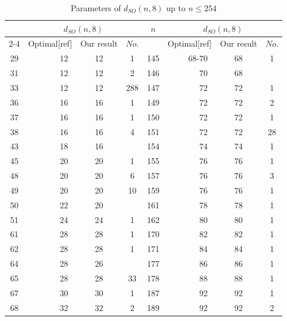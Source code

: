 \documentclass{article}
\theoremstyle{definition}
\theoremstyle{remark}
\begin{document}
\begin{table}[!htb]
\centering
\caption{Parameters of $d_{SO}(n, 8)$ up to $n\le 254$}
\label{tab:my_table_8col}
\small
\begin{tabular}{c|r|c|c|c|r|c|c}
\Xhline{2\arrayrulewidth}
\multirow{2}{*}{$n$} & \multicolumn{3}{c|}{$d_{SO}(n, 8)$} & \multirow{2}{*}{$n$} & \multicolumn{3}{c}{$d_{SO}(n, 8)$} \\
\cline{2-4} \cline{6-8}
 & Optimal[ref] & Our result & $No.$ &  & Optimal[ref] & Our result & $No.$  \\
\Xhline{2\arrayrulewidth}
29 & 12~\cite{Bouyukliev2006} & 12 & 1 & 145 & 68-70~\cite{Li2025} & 68 & 1\\
\hline
31 & 12~\cite{Bouyukliev2006} & 12 & 2 & 146 & 70~\cite{Li2025} & 68 &\\
\hline
33 & 12~\cite{Bouyukliev2006} & 12 & 288 & 147 & 72~\cite{Li2025} & 72 & 1\\
\hline
36 & 16~\cite{Bouyukliev2006} & 16 & 1 & 149 & 72~\cite{Li2025} & 72 & 2\\
\hline
37 & 16~\cite{Bouyukliev2006} & 16 & 1 & 150 & 72~\cite{Li2025} & 72 & 1\\
\hline
38 & 16~\cite{Bouyukliev2006} & 16 & 4 & 151 & 72~\cite{Li2025} & 72 & 28\\
\hline
43 & 18~\cite{Li2025} & 16 & & 154 & 74~\cite{Li2025} & 74 & 1\\
\hline
45 & 20~\cite{Li2025} & 20 & 1 & 155 & 76~\cite{Li2025} & 76 & 1\\
\hline
48 & 20~\cite{Li2025} & 20 & 6 & 157 & 76~\cite{Li2025} & 76 & 3\\
\hline
49 & 20~\cite{Li2025} & 20 & 10 & 159 & 76~\cite{Li2025} & 76 & 1\\
\hline
50 & 22~\cite{Li2025} & 20 & & 161 & 78~\cite{Li2025} & 78 & 1\\
\hline
51 & 24~\cite{Li2025} & 24 & 1 & 162 & 80~\cite{Li2025} & 80 & 1\\
\hline
61 & 28~\cite{Li2025} & 28 & 1 & 170 & 82~\cite{Li2025} & 82 & 1\\
\hline
62 & 28~\cite{Li2025} & 28 & 1 & 171 & 84~\cite{Li2025} & 84 & 1\\
\hline
64 & 28~\cite{Li2025} & 26 & & 177 & 86~\cite{Li2025} & 86 & 1\\
\hline
65 & 28~\cite{Li2025} & 28 & 33 & 178 & 88~\cite{Li2025} & 88 & 1\\
\hline
67 & 30~\cite{Li2025} & 30 & 1 & 187 & 92~\cite{Li2025} & 92 & 1\\
\hline
68 & 32~\cite{Li2025} & 32 & 2 & 189 & 92~\cite{Li2025} & 92 & 2\\

\end{tabular}
\end{table}
\end{document}
